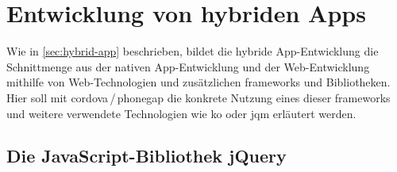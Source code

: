 %


\section{Entwicklung von hybriden Apps}	\label{sec:hybrid-dev}


Wie in \ref{sec:hybrid-app} beschrieben, bildet die hybride App-Entwicklung die Schnittmenge aus der nativen App-Entwicklung und der Web-Entwicklung mithilfe von Web-Technologien und zusätzlichen \glspl{framework} und Bibliotheken. 
Hier soll mit \gls{cordova}\,/\,\gls{phonegap} die konkrete Nutzung eines dieser \glspl{framework} und weitere verwendete Technologien wie \gls{ko} oder \gls{jqm} erläutert werden.

\subsection{Die JavaScript-Bibliothek jQuery}

